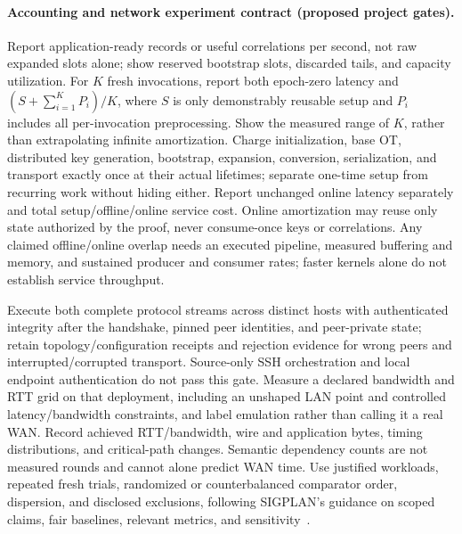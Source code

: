 \documentclass[11pt]{article}
\begin{document}
\paragraph{Accounting and network experiment contract (proposed project gates).}
Report application-ready records or useful correlations per second, not raw
expanded slots alone; show reserved bootstrap slots, discarded tails, and
capacity utilization. For $K$ fresh invocations, report both epoch-zero latency
and $(S+\sum_{i=1}^{K}P_i)/K$, where $S$ is only demonstrably reusable setup and
$P_i$ includes all per-invocation preprocessing. Show the measured range of
$K$, rather than extrapolating infinite amortization. Charge initialization,
base OT, distributed key generation, bootstrap, expansion, conversion,
serialization, and transport exactly once at their actual lifetimes; separate
one-time setup from recurring work without hiding either. Report unchanged
online latency separately and total setup/offline/online service cost.
Online amortization may reuse only state authorized by the proof, never
consume-once keys or correlations. Any claimed offline/online overlap needs
an executed pipeline, measured buffering and memory, and sustained producer
and consumer rates; faster kernels alone do not establish service throughput.

Execute both complete protocol streams across distinct hosts with authenticated
integrity after the handshake, pinned peer identities, and peer-private state;
retain topology/configuration receipts and rejection evidence for wrong peers
and interrupted/corrupted transport. Source-only SSH orchestration and local
endpoint authentication do not pass this gate. Measure a declared bandwidth
and RTT grid on that deployment, including an unshaped LAN point and controlled
latency/bandwidth constraints, and label emulation rather than calling it a
real WAN. Record achieved RTT/bandwidth, wire and application bytes, timing
distributions, and critical-path changes. Semantic dependency counts are not
measured rounds and cannot alone predict WAN time. Use justified workloads,
repeated fresh trials, randomized or counterbalanced comparator order,
dispersion, and disclosed exclusions, following SIGPLAN's guidance on scoped
claims, fair baselines, relevant metrics, and sensitivity~\cite{sigplanempirical}.
\end{document}
